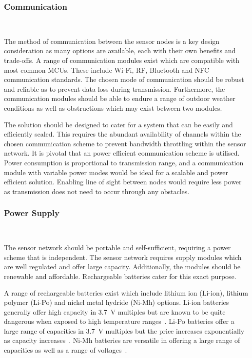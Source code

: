 \documentclass[10pt,twocolumn]{witseiepaper}
\begin{document}
		\subsubsection{Communication} $   $

			The method of communication between the sensor nodes is a key design consideration as many options are available, each with their own benefits and trade-offs. A range of communication modules exist which are compatible with most common MCUs. These include Wi-Fi, RF, Bluetooth and NFC communication standards. The chosen mode of communication should be robust and reliable as to prevent data loss during transmission. Furthermore, the communication modules should be able to endure a range of outdoor weather conditions as well as obstructions which may exist between two modules.

			The solution should be designed to cater for a system that can be easily and efficiently scaled. This requires the abundant availability of channels within the chosen communication scheme to prevent bandwidth throttling within the sensor network. It is pivotal that an power efficient communication scheme is utilised. Power consumption is proportional to transmission range, and a communication module with variable power modes would be ideal for a scalable and power efficient solution. Enabling line of sight between nodes would require less power as transmission does not need to occur through any obstacles.
			
		\subsubsection{Power Supply} $   $
			
			The sensor network should be portable and self-sufficient, requiring a power scheme that is independent. The sensor network requires supply modules which are well regulated and offer large capacity. Additionally, the modules should be renewable and affordable. Rechargeable batteries cater for this exact purpose.

			A range of rechargeable batteries exist which include lithium ion (Li-ion), lithium polymer (Li-Po) and nickel metal hydride (Ni-Mh) options. Li-ion batteries generally offer high capacity in 3.7~V multiples but are known to be quite dangerous when exposed to high temperature ranges~\cite{li-ion}. Li-Po batteries offer a large range of capacities in 3.7~V multiples but the price increases exponentially as capacity increases~\cite{li-po}. Ni-Mh batteries are versatile in offering a large range of capacities as well as a range of voltages~\cite{ni-mh}.
\end{document}
